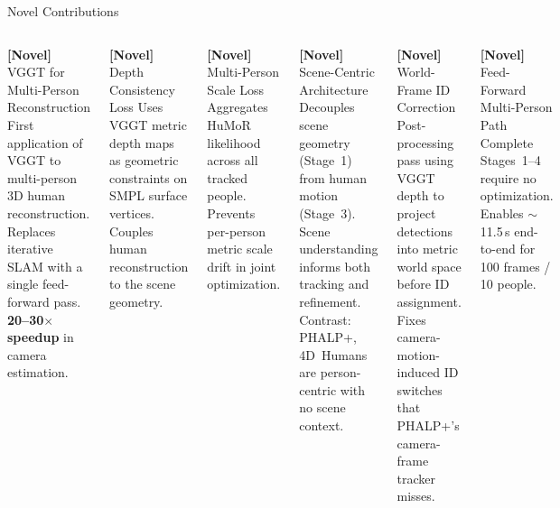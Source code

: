 \documentclass[aspectratio=169,11pt]{beamer}
\newcommand{\novel}[1]{\textcolor{novelcolor}{\textbf{[Novel] }}\textcolor{novelcolor}{#1}}
\begin{document}
\begin{frame}{Novel Contributions}
  \begin{columns}[T]
      \begin{block}{\novel{VGGT for Multi-Person Reconstruction}}
        First application of VGGT to multi-person 3D human reconstruction.
        Replaces iterative SLAM with a single feed-forward pass.
        \textbf{20--30$\times$ speedup} in camera estimation.
      \end{block}
      \vspace{0.4em}
      \begin{block}{\novel{Depth Consistency Loss}}
        Uses VGGT metric depth maps as geometric constraints on SMPL surface vertices.
        Couples human reconstruction to the scene geometry.
      \end{block}
      \vspace{0.4em}
      \begin{block}{\novel{Multi-Person Scale Loss}}
        Aggregates HuMoR likelihood across all tracked people.
        Prevents per-person metric scale drift in joint optimization.
      \end{block}
      \begin{block}{\novel{Scene-Centric Architecture}}
        Decouples scene geometry (Stage~1) from human motion (Stage~3).
        Scene understanding informs both tracking and refinement.
        Contrast: PHALP+, 4D~Humans are person-centric with no scene context.
      \end{block}
      \vspace{0.4em}
      \begin{block}{\novel{World-Frame ID Correction}}
        Post-processing pass using VGGT depth to project detections into
        metric world space before ID assignment.
        Fixes camera-motion-induced ID switches that PHALP+'s
        camera-frame tracker misses.
      \end{block}
      \vspace{0.4em}
      \begin{block}{\novel{Feed-Forward Multi-Person Path}}
        Complete Stages~1--4 require no optimization.
        Enables $\sim$11.5\,s end-to-end for 100 frames / 10 people.
      \end{block}
  \end{columns}
\end{frame}

\end{document}
